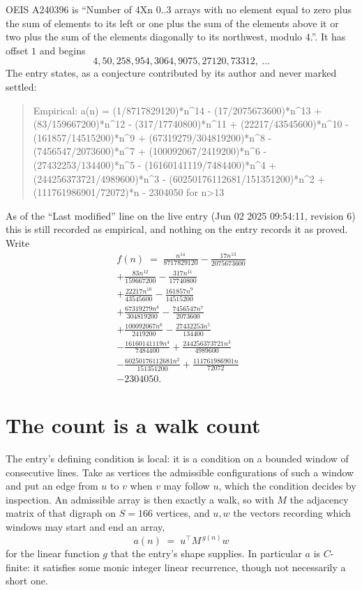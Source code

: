 \documentclass[11pt,a4paper]{article}
\theoremstyle{plain}
\theoremstyle{definition}
\begin{document}
OEIS A240396 is ``Number of 4Xn 0..3 arrays with no element equal to zero plus the sum of elements to its left or one plus the sum of the elements above it or two plus the sum of the elements diagonally to its northwest, modulo 4.''. It has offset $1$ and begins
\[
4, 50, 258, 954, 3064, 9075, 27120, 73312,\ \dots
\]
The entry states, as a conjecture contributed by its author and never marked settled:
\begin{quote}\raggedright\small
Empirical: a(n) = (1/8717829120)*n\^{}14 - (17/2075673600)*n\^{}13 + (83/159667200)*n\^{}12 - (317/17740800)*n\^{}11 + (22217/43545600)*n\^{}10 - (161857/14515200)*n\^{}9 + (67319279/304819200)*n\^{}8 - (7456547/2073600)*n\^{}7 + (100092067/2419200)*n\^{}6 - (27432253/134400)*n\^{}5 - (16160141119/7484400)*n\^{}4 + (244256373721/4989600)*n\^{}3 - (60250176112681/151351200)*n\^{}2 + (111761986901/72072)*n - 2304050 for n>13
\end{quote}
As of the ``Last modified'' line on the live entry (Jun 02 2025 09:54:11, revision 6) this is still
recorded as empirical, and nothing on the entry records it as proved. Write
\begin{multline*}
f(n)\;=\;\frac{n^{14}}{8717829120} - \frac{17 n^{13}}{2075673600} \\
+ \frac{83 n^{12}}{159667200} - \frac{317 n^{11}}{17740800} \\
+ \frac{22217 n^{10}}{43545600} - \frac{161857 n^{9}}{14515200} \\
+ \frac{67319279 n^{8}}{304819200} - \frac{7456547 n^{7}}{2073600} \\
+ \frac{100092067 n^{6}}{2419200} - \frac{27432253 n^{5}}{134400} \\
- \frac{16160141119 n^{4}}{7484400} + \frac{244256373721 n^{3}}{4989600} \\
- \frac{60250176112681 n^{2}}{151351200} + \frac{111761986901 n}{72072} \\
- 2304050.
\end{multline*}

\section{The count is a walk count}

The entry's defining condition is local: it is a condition on a bounded window of consecutive lines. Take as vertices the
admissible configurations of such a window and put an edge from $u$ to $v$ when $v$ may
follow $u$, which the condition decides by inspection. An admissible array is then exactly a
walk, so with $M$ the adjacency matrix of that digraph on $S=166$ vertices, and $u,w$ the
vectors recording which windows may start and end an array,
\[
a(n)\;=\;u^{\!\top}M^{\,g(n)}w
\]
for the linear function $g$ that the entry's shape supplies. In particular $a$ is
$C$-finite: it satisfies some monic integer linear recurrence, though not necessarily a short
one.
\end{document}
